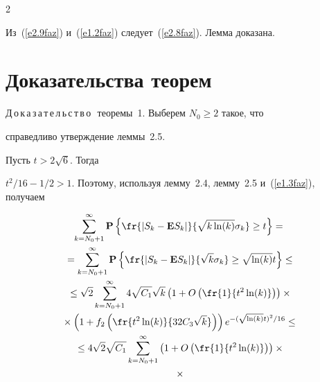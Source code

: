 \begin{multicols}{2}
\begin{equation}
\end{equation}


Из~(\ref{e2.9faz}) и~(\ref{e1.2faz}) следует~(\ref{e2.8faz}). Лемма доказана.





\medskip





\section{Доказательства теорем}





\noindent


Д\,о\,к\,а\,з\,а\,т\,е\,л\,ь\,с\,т\,в\,о\,\ теоремы~1.  Выберем $N_0\ge 2$ такое, что


справедливо утверждение  леммы~2.5.


 Пусть $t>2\sqrt{6}$. Тогда


${t^2}/{16}-{1}/{2}>1$. Поэтому, используя лемму~2.4, лемму~2.5 и~(\ref{e1.3faz}), получаем


\begin{multline*}


 \sum_{k=N_0+1}^{\infty} \P\left\{\fr{|S_k-{\E}S_k|}{\sqrt{k\ln(k)}\sigma_k} \ge t\right\} ={}\\


 {}=\sum_{k=N_0+1}^{\infty}


\P\left\{\fr{|S_{k}-{\E}S_{k}|} {\sqrt{k}\sigma_k}\ge


\sqrt{\ln(k)}t\right\}\le{}


\\


{}\le\sqrt{2}\sum_{k=N_0+1}^{\infty}4\sqrt{C_1}\sqrt{k}\left(1+O\left(\fr{1}{t^2\ln(k)}\right)


\right)\times{}\\


{}\times \left(1+f_2\left(\fr{t^2\ln(k)}{32C_3


\sqrt{k}}\right)\right)e^{-{(\sqrt{\ln(k)}t)^2}/{16}}\le{}\\


{}


\le 4\sqrt{2}\sqrt{C_1}


\sum_{k=N_0+1}^{\infty}\left(1+O\left(\fr{1}{t^2\ln(k)}\right)


\right)\times{}\\


{}\times



\end{multline*}
\end{multicols}
